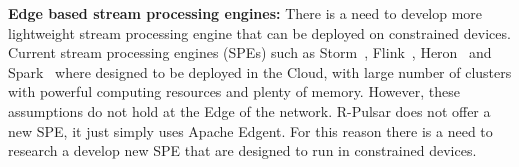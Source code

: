 \textbf{Edge based stream processing engines:} There is a need to develop more lightweight stream processing engine that can be deployed on constrained devices. Current stream processing engines (SPEs) such as Storm~\cite{storm}, Flink~\cite{flink}, Heron~\cite{heron} and Spark~\cite{spark} where designed to be deployed in the Cloud, with large number of clusters with powerful computing resources and plenty of memory. However, these assumptions do not hold at the Edge of the network. R-Pulsar does not offer a new SPE, it just simply uses Apache Edgent. For this reason there is a need to research a develop new SPE that are designed to run in constrained devices.
